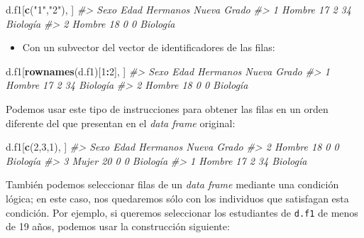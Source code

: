 \documentclass[
]{book}
\newenvironment{Shaded}{\begin{snugshade}}{\end{snugshade}}
\newcommand{\CommentTok}[1]{\textcolor[rgb]{0.56,0.35,0.01}{\textit{#1}}}
\newcommand{\DecValTok}[1]{\textcolor[rgb]{0.00,0.00,0.81}{#1}}
\newcommand{\KeywordTok}[1]{\textcolor[rgb]{0.13,0.29,0.53}{\textbf{#1}}}
\newcommand{\NormalTok}[1]{#1}
\newcommand{\OperatorTok}[1]{\textcolor[rgb]{0.81,0.36,0.00}{\textbf{#1}}}
\newcommand{\StringTok}[1]{\textcolor[rgb]{0.31,0.60,0.02}{#1}}
\providecommand{\tightlist}{%
  \setlength{\itemsep}{0pt}\setlength{\parskip}{0pt}}
\theoremstyle{definition}
\theoremstyle{definition}
\theoremstyle{definition}
\theoremstyle{remark}
\begin{document}
\begin{Shaded}
\begin{Highlighting}[]
\NormalTok{d.f1[}\KeywordTok{c}\NormalTok{(}\StringTok{"1"}\NormalTok{,}\StringTok{"2"}\NormalTok{), ] }
\CommentTok{\#\textgreater{}     Sexo Edad Hermanos Nueva    Grado}
\CommentTok{\#\textgreater{} 1 Hombre   17        2    34 Biología}
\CommentTok{\#\textgreater{} 2 Hombre   18        0     0 Biología}
\end{Highlighting}
\end{Shaded}

\begin{itemize}
\tightlist
\item
  Con un subvector del vector de identificadores de las filas:
\end{itemize}

\begin{Shaded}
\begin{Highlighting}[]
\NormalTok{d.f1[}\KeywordTok{rownames}\NormalTok{(d.f1)[}\DecValTok{1}\OperatorTok{:}\DecValTok{2}\NormalTok{], ]}
\CommentTok{\#\textgreater{}     Sexo Edad Hermanos Nueva    Grado}
\CommentTok{\#\textgreater{} 1 Hombre   17        2    34 Biología}
\CommentTok{\#\textgreater{} 2 Hombre   18        0     0 Biología}
\end{Highlighting}
\end{Shaded}

Podemos usar este tipo de instrucciones para obtener las filas en un orden diferente del que presentan en el \emph{data frame} original:

\begin{Shaded}
\begin{Highlighting}[]
\NormalTok{d.f1[}\KeywordTok{c}\NormalTok{(}\DecValTok{2}\NormalTok{,}\DecValTok{3}\NormalTok{,}\DecValTok{1}\NormalTok{), ]}
\CommentTok{\#\textgreater{}     Sexo Edad Hermanos Nueva    Grado}
\CommentTok{\#\textgreater{} 2 Hombre   18        0     0 Biología}
\CommentTok{\#\textgreater{} 3  Mujer   20        0     0 Biología}
\CommentTok{\#\textgreater{} 1 Hombre   17        2    34 Biología}
\end{Highlighting}
\end{Shaded}

También podemos seleccionar filas de un \emph{data frame} mediante una condición lógica; en este caso, nos quedaremos sólo con los individuos que satisfagan esta condición. Por ejemplo, si queremos seleccionar los estudiantes de \texttt{d.f1} de menos de 19 años, podemos usar la construcción siguiente:
\end{document}
